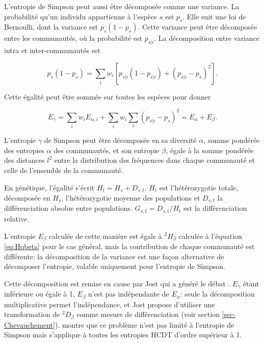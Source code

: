 \documentclass[
  11pt,
  french,
  a4paper,
  extrafontsizes,onecolumn,openright
  ]{memoir}
\begin{document}
L'entropie de Simpson peut aussi être décomposée comme une variance.
La probabilité qu'un individu appartienne à l'espèce \(s\) est \(p_s\).
Elle suit une loi de Bernoulli, dont la variance est \(p_s\left(1-p_s\right)\).
Cette variance peut être décomposée entre les communautés, où la probabilité est \(p_{s|i}\).
La décomposition entre variance intra et inter-communautés est

\begin{equation}
  \label{eq:DecSimpsons}
  p_s\left(1-p_s\right)=\sum_i{w_i\left[p_{s|i}\left(1-p_{s|i}\right)+{\left(p_{s|i}-p_s\right)}^2\right]}.
\end{equation}

Cette égalité peut être sommée sur toutes les espèces pour donner

\begin{equation}
  \label{eq:SimpsonNei}
  E_{\gamma}=\sum_i{w_i E_{\alpha,i}}+\sum_i{w_i\sum_s{{\left(p_{s|i}-p_s\right)}^2}}=E_{\alpha}+E_{\beta}.
\end{equation}

L'entropie \(\gamma\) de Simpson peut être décomposée en sa diversité \(\alpha\), somme pondérée des entropies \(\alpha\) des communautés, et son entropie \(\beta\), égale à la somme pondérée des distances \(l^2\) entre la distribution des fréquences dans chaque communauté et celle de l'ensemble de la communauté.

En génétique, l'égalité s'écrit\autocite{Nei1973} \(H_t=H_s+D_{s,t}\).
\(H_t\) est l'hétérozygotie totale, décomposée en \(H_s\), l'hétérozygotie moyenne des populations et \(D_{s,t}\) la différenciation absolue entre populations.
\(G_{s,t}={D_{s,t}}/{H_t}\) est la différenciation relative.

L'entropie \(E_{\beta}\) calculée de cette manière est égale à \(^{2}\!H_{\beta}\) calculée à l'équation \eqref{eq:Hqbeta} pour le cas général, mais la contribution de chaque communauté est différente: la décomposition de la variance est une façon alternative de décomposer l'entropie, valable uniquement pour l'entropie de Simpson.

Cette décomposition est remise en cause par Jost \autocite{Jost2007,Jost2008} qui a généré le débat \autocite{Heller2009,Ryman2009,Jost2009a,Whitlock2011}.
\(E_{\gamma}\) étant inférieure ou égale à 1, \(E_{\beta}\) n'est pas indépendante de \(E_{\alpha}\): seule la décomposition multiplicative permet l'indépendance, et Jost propose d'utiliser une transformation de \(^{2}\!D_{\beta}\) comme mesure de différenciation (voir section \ref{sec-Chevauchement}). \textcite{Gregorius2014} montre que ce problème n'est pas limité à l'entropie de Simpson mais s'applique à toutes les entropies HCDT d'ordre supérieur à 1.
\end{document}
